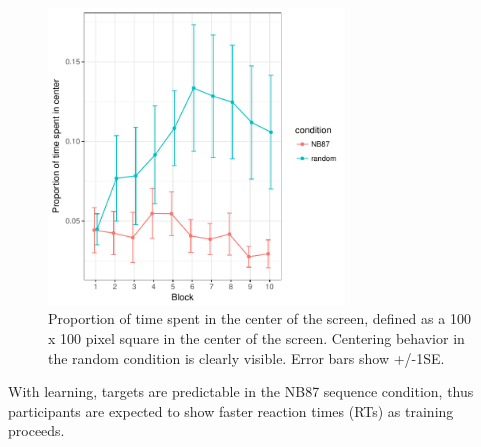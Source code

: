 \documentclass[man,floatsintext]{apa6}
\begin{document}
\begin{figure}[!h]
  \centering
  \includegraphics[width=0.7\textwidth]{figures/centering_behavior}
  \caption{Proportion of time spent in the center of the screen, defined as a 100 x 100 pixel square in the center of the screen. Centering behavior in the random condition is clearly visible. Error bars show +/-1SE.}
  \label{fig:centering}
\end{figure} 


With learning, targets are predictable in the NB87 sequence condition, thus participants are expected to show faster reaction times (RTs) as training proceeds.
\end{document}
